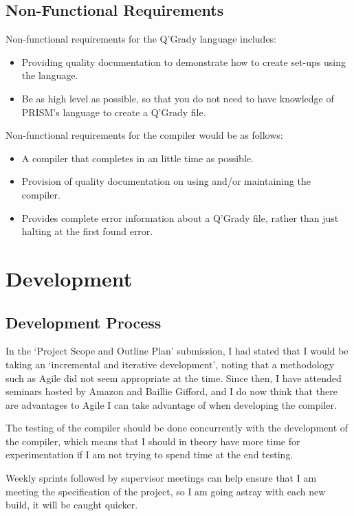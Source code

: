 \documentclass[11pt, a4paper]{article}
\begin{document}
\subsection{Non-Functional Requirements} %
\label{sub:non_functional_requirements}
Non-functional requirements for the Q'Grady language includes:
\begin{itemize}
    \item Providing quality documentation to demonstrate how to create set-ups
    using the language.
    \item Be as high level as possible, so that you do not need to
    have knowledge of PRISM's language to create a Q'Grady file.
\end{itemize}
Non-functional requirements for the compiler would be as follows:
\begin{itemize}
    \item A compiler that completes in an little time as possible.
    \item Provision of quality documentation on using and/or maintaining the
    compiler.
    \item Provides complete error information about a Q'Grady file, rather than
    just halting at the first found error.
\end{itemize}


\section{Development} %
\label{sec:development}
\subsection{Development Process} %
\label{sub:development_process}
In the `Project Scope and Outline Plan' submission, I had stated that I would
be taking an `incremental and iterative development', noting that a methodology
such as Agile did not seem appropriate at the time. Since then, I have attended
seminars hosted by Amazon and Baillie Gifford, and I do now think that there
are advantages to Agile I can take advantage of when developing the compiler.

The testing of the compiler should be done concurrently with the development of
the compiler, which means that I should in theory have more time for
experimentation if I am not trying to spend time at the end testing.

Weekly sprints followed by supervisor meetings can help ensure that I am meeting
the specification of the project, so I am going astray with each new build, it
will be caught quicker.
\end{document}
